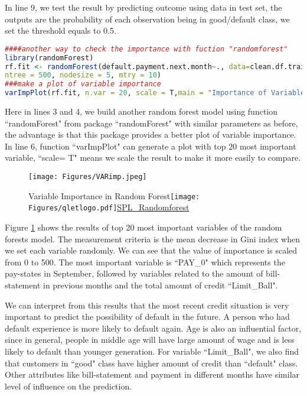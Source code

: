 \documentclass[a4paper,11pt]{article}
\begin{document}
In line 9, we test the result by predicting outcome using data in test set, the outputs are the probability of each observation being in good/default class, we set the threshold equals to 0.5.

\begin{lstlisting}[language=R]
####another way to check the importance with fuction "randomforest"
library(randomForest)
rf.fit <- randomForest(default.payment.next.month~., data=clean.df.train, 
ntree = 500, nodesize = 5, mtry = 10) 
###make a plot of variable importance
varImpPlot(rf.fit, n.var = 20, scale = T,main = "Importance of Variables")
\end{lstlisting}
Here in lines 3 and 4, we build another random forest model using function ``randomForest" from package ``randomForest" with similar parameters as before, the advantage is that this package provides a better plot of variable importance. In line 6, function ``varImpPlot" can generate a plot with top 20 most important variable, ``scale= T" means we scale the result to make it more easily to compare.

 \begin{figure}[!ht] 
	\centering\texttt{[image: Figures/VARimp.jpeg]} 
	\caption{Variable Importance in Random Forest\protect\texttt{[image: Figures/qletlogo.pdf]}\href{https://github.com/Jingmin24/R-programming/tree/master/SPL_RandomForest}{SPL\_Randomforest}}\label{fig:rfimp} 
\end{figure}
Figure \ref{fig:rfimp} shows the results of top 20 most important variables of the random forests model. The measurement criteria is the mean decrease in Gini index when we set each variable randomly. We can see that the value of importance is scaled from 0 to 500. The most important variable is ``PAY\_0" which represents the pay-states in September, followed by variables related to the amount of bill-statement in previous months and the total amount of credit ``Limit\_Ball".

We can interpret from this results that the most recent credit situation is very important to predict the possibility of default in the future. A person who had default experience is more likely to default again. Age is also an influential factor, since in general, people in middle age will have large amount of wage and is less likely to default than younger generation. For variable ``Limit\_Ball", we also find that customers in ``good" class have higher amount of credit than ``default" class. Other attributes like bill-statement and payment in different months have similar level of influence on the prediction.    
\end{document}
